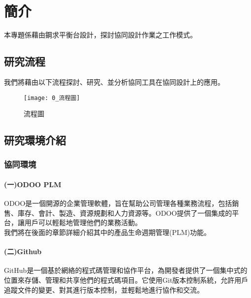 \chapter{簡介}
\renewcommand{\baselinestretch}{10.0} %
\setcounter{page}{1}  %
\fontsize{14pt}{2.5pt}\sectionef

本專題係藉由鋼求平衡台設計，探討協同設計作業之工作模式。

\section{研究流程}
我們將藉由以下流程探討、研究、並分析協同工具在協同設計上的應用。\\

\begin{figure}[hbt!]
\center
\texttt{[image: 0\_流程圖]}
\caption{\Large 流程圖}\label{0_流程圖}
\end{figure}

\section{研究環境介紹}
\subsection{協同環境}
\fontsize{14pt}{2.5pt}\sectionef\hspace{12pt} 
\subsubsection{(一)ODOO PLM}
\fontsize{14pt}{2.5pt}\sectionef\hspace{12pt} ODOO是一個開源的企業管理軟體，旨在幫助公司管理各種業務流程，包括銷售、庫存、會計、製造、資源規劃和人力資源等。ODOO提供了一個集成的平台，讓用戶可以輕鬆地管理他們的業務活動。\\
\fontsize{14pt}{2.5pt}\sectionef\hspace{12pt}
我們將在後面的章節詳細介紹其中的產品生命週期管理(PLM)功能。\\
\subsubsection{(二)Github}
GitHub是一個基於網絡的程式碼管理和協作平台，為開發者提供了一個集中式的位置來存儲、管理和共享他們的程式碼項目。它使用Git版本控制系統，允許用戶追蹤文件的變更、對其進行版本控制，並輕鬆地進行協作和交流。\\

